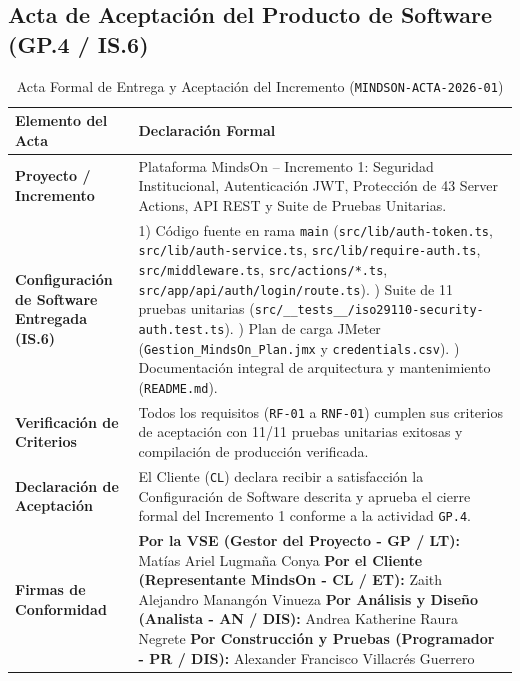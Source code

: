 \documentclass[11pt,a4paper]{article}
\begin{document}
\subsection{Acta de Aceptación del Producto de Software (GP.4 / IS.6)}
\begin{table}[h!]
\centering
\caption{Acta Formal de Entrega y Aceptación del Incremento (\texttt{MINDSON-ACTA-2026-01})}
\renewcommand{\arraystretch}{1.25}
\begin{tabular}{@{}p{4.0cm}p{11.5cm}@{}}
\toprule
\rowcolor{tableHeader}
\textbf{Elemento del Acta} & \textbf{Declaración Formal} \\
\midrule
\textbf{Proyecto / Incremento} & Plataforma MindsOn -- Incremento 1: Seguridad Institucional, Autenticación JWT, Protección de 43 Server Actions, API REST y Suite de Pruebas Unitarias. \\
\textbf{Configuración de Software Entregada (IS.6)} & 1) Código fuente en rama \texttt{main} (\texttt{src/lib/auth-token.ts}, \texttt{src/lib/auth-service.ts}, \texttt{src/lib/require-auth.ts}, \texttt{src/middleware.ts}, \texttt{src/actions/*.ts}, \texttt{src/app/api/auth/login/route.ts}). \newline
2) Suite de 11 pruebas unitarias (\texttt{src/\_\_tests\_\_/iso29110-security-auth.test.ts}). \newline
3) Plan de carga JMeter (\texttt{Gestion\_MindsOn\_Plan.jmx} y \texttt{credentials.csv}). \newline
4) Documentación integral de arquitectura y mantenimiento (\texttt{README.md}). \\
\textbf{Verificación de Criterios} & Todos los requisitos (\texttt{RF-01} a \texttt{RNF-01}) cumplen sus criterios de aceptación con 11/11 pruebas unitarias exitosas y compilación de producción verificada. \\
\textbf{Declaración de Aceptación} & El Cliente (\texttt{CL}) declara recibir a satisfacción la Configuración de Software descrita y aprueba el cierre formal del Incremento 1 conforme a la actividad \texttt{GP.4}. \\
\textbf{Firmas de Conformidad} & \textbf{Por la VSE (Gestor del Proyecto - GP / LT):} Matías Ariel Lugmaña Conya \newline
\textbf{Por el Cliente (Representante MindsOn - CL / ET):} Zaith Alejandro Manangón Vinueza \newline
\textbf{Por Análisis y Diseño (Analista - AN / DIS):} Andrea Katherine Raura Negrete \newline
\textbf{Por Construcción y Pruebas (Programador - PR / DIS):} Alexander Francisco Villacrés Guerrero \\
\bottomrule
\end{tabular}
\end{table}
\end{document}
